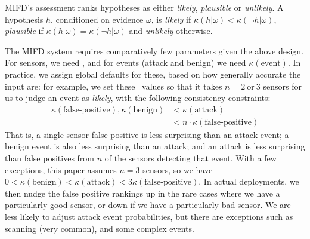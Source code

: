 MIFD's assessment ranks hypotheses as either
\emph{likely}, \emph{plausible} or \emph{unlikely}. A hypothesis $h$,
conditioned on evidence $\omega$,
is \emph{likely} if
$\kappa(h|\omega) < \kappa(\neg h|\omega)$, \emph{plausible} if $\kappa(h|\omega) = \kappa(\neg h|\omega)$
and \emph{unlikely} otherwise.

The MIFD system requires comparatively few \tkappa parameters given the above
design.  For sensors, we need \fpKappa, and for events (attack and benign)
we need $\kappa(\text{event})$.  In practice, we assign global defaults for
these, based on how generally accurate the input \idses are: for example, we set
these \tkappa\ values so that it takes $n = 2\ \text{or}\ 3$ sensors for us to judge an event
as \emph{likely}, with
the following consistency constraints:
\begin{align}
  \label{eqn:coherence-ineq}
  \kappa(\text{false-positive}),\kappa(\text{benign})
  &< \kappa(\text{attack}) \\
 &< n \cdot \kappa(\text{false-positive}) \nonumber
\end{align}
That is, a single sensor false positive is less surprising than an
  attack event;
a benign event is also less surprising than an attack; and
an attack is less surprising than false positives from $n$
  of the sensors detecting that event.
%
With a few exceptions, this paper assumes $n=3$ sensors, so we
have $0 < \kappa(\text{benign}) < \kappa(\text{attack}) 
    < 3 \kappa(\text{false-positive})$.
In actual deployments, we then
nudge the false positive rankings up in the rare cases where we have a
particularly good sensor, or down if we have a particularly bad sensor.
We are less likely to adjust attack event probabilities, but
there are exceptions such as scanning (very common), and some complex events.


